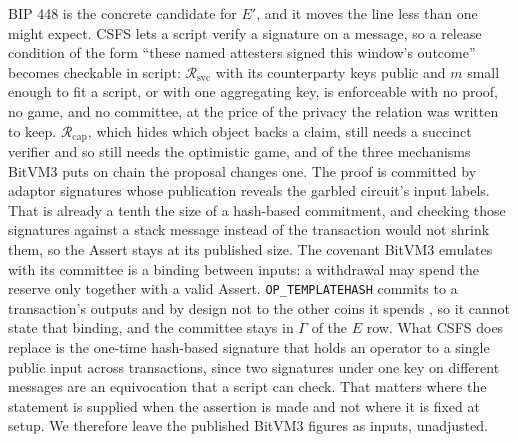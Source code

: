 \documentclass[11pt]{article}
\theoremstyle{plain}
\theoremstyle{definition}
\theoremstyle{remark}
\newcommand{\Rcap}{\mathcal{R}_{\mathrm{cap}}}
\newcommand{\Rsvc}{\mathcal{R}_{\mathrm{svc}}}
\begin{document}
BIP 448 is the concrete candidate for $E'$, and it moves the line less than one might expect. CSFS lets a script verify a signature on a message, so a release condition of the form ``these named attesters signed this window's outcome'' becomes checkable in script: $\Rsvc$ with its counterparty keys public and $m$ small enough to fit a script, or with one aggregating key, is enforceable with no proof, no game, and no committee, at the price of the privacy the relation was written to keep. $\Rcap$, which hides which object backs a claim, still needs a succinct verifier and so still needs the optimistic game, and of the three mechanisms BitVM3 puts on chain \citep{linus2026bitvm3} the proposal changes one. The proof is committed by adaptor signatures whose publication reveals the garbled circuit's input labels. That is already a tenth the size of a hash-based commitment, and checking those signatures against a stack message instead of the transaction would not shrink them, so the Assert stays at its published size. The covenant BitVM3 emulates with its committee is a binding between inputs: a withdrawal may spend the reserve only together with a valid Assert. \texttt{OP\_TEMPLATEHASH} commits to a transaction's outputs and by design not to the other coins it spends \citep{bip446}, so it cannot state that binding, and the committee stays in $\Gamma$ of the $E$ row. What CSFS does replace is the one-time hash-based signature that holds an operator to a single public input across transactions, since two signatures under one key on different messages are an equivocation that a script can check. That matters where the statement is supplied when the assertion is made and not where it is fixed at setup. We therefore leave the published BitVM3 figures as inputs, unadjusted.
\end{document}
